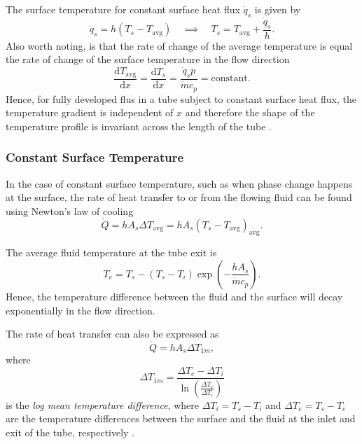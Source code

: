 The surface temperature for constant surface heat flux $\dot{q}_s$ is given by 
\begin{equation*}
  \dot{q}_s = h (T_s - T_{\mathrm{avg}}) \quad \implies \quad T_s = T_{\mathrm{avg}} + \frac{\dot{q}_s}{h}
.\end{equation*}
Also worth noting, is that the rate of change of the average temperature is equal the rate of change of the surface temperature in the flow direction 
\begin{equation*}
  \frac{\mathrm{d}T_{\mathrm{avg}}}{\mathrm{d}x} = \frac{\mathrm{d}T_s}{\mathrm{d}x} = \frac{\dot{q}_s p}{\dot{m} c_p} = \mathrm{constant}
.\end{equation*}
Hence, for fully developed flus in a tube subject to constant surface heat flux, the temperature gradient is independent of $x$ and therefore the shape of the temperature profile is invariant across the length of the tube .

\subsubsection{Constant Surface Temperature}
In the case of constant surface temperature, such as when phase change happens at the surface, the rate of heat transfer to or from the flowing fluid can be found using Newton's law of cooling 
\begin{equation*}
  \dot{Q} = h A_s \Delta T_{\mathrm{avg}} = h A_s \left( T_s - T_{\mathrm{avg}} \right)_{\mathrm{avg}}
.\end{equation*}

The average fluid temperature at the tube exit is 
\begin{equation*}
  T_e = T_s - (T_s - T_i) \exp \left( - \frac{h A_s}{\dot{m} c_p} \right)
.\end{equation*}
Hence, the temperature difference between the fluid and the surface will decay exponentially in the flow direction.

The rate of heat transfer can also be expressed as 
\begin{equation*}
  \dot{Q} = h A_s \Delta T_{1m}
,\end{equation*}
where 
\begin{equation*}
  \Delta T_{1m} = \frac{\Delta T_e - \Delta T_i}{\ln \left( \frac{\Delta T_e}{\Delta T_i} \right)}
\end{equation*}
is the \textit{log mean temperature difference}, where $\Delta T_i = T_s - T_i$ and $\Delta T_e = T_s - T_e$ are the temperature differences between the surface and the fluid at the inlet and exit of the tube, respectively .
